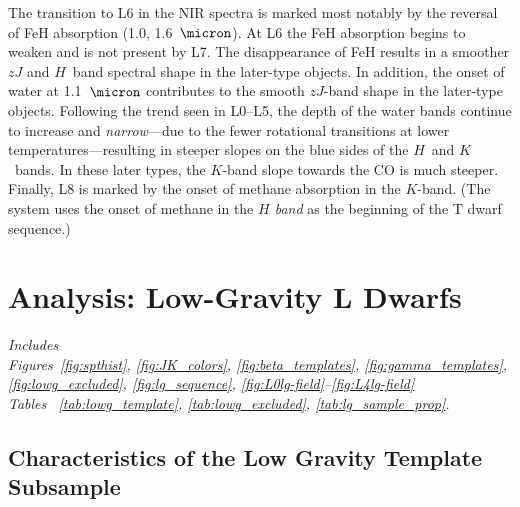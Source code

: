 \documentclass[12pt,preprint]{aastex}
\begin{document}
The transition to L6 in the NIR spectra is marked most notably by the reversal of FeH absorption (1.0, 1.6~$\micron$). 
At L6 the FeH absorption begins to weaken and is not present by L7. 
The disappearance of FeH results in a smoother $zJ$ and $H$~band spectral shape in the later-type objects. In addition, the onset of water at 1.1~$\micron$ contributes to the smooth $zJ$-band shape in the later-type objects. Following the trend seen in L0--L5, the depth of the water bands continue to increase and \emph{narrow}---due to the fewer rotational transitions at lower temperatures---resulting in steeper slopes on the blue sides of the $H$~and $K$~bands. 
In these later types, the $K$-band slope towards the CO is much steeper. 
Finally, L8 is marked by the onset of methane absorption in the $K$-band. 
(The \citet{Geballe02} system uses the onset of methane in the \emph{$H$ band} as the beginning of the T dwarf sequence.) 


\clearpage
\section{Analysis: Low-Gravity L Dwarfs}
\label{sec:lowg}

\emph{Includes \\
Figures~\ref{fig:spthist}, \ref{fig:JK_colors}, \ref{fig:beta_templates}, \ref{fig:gamma_templates}, \ref{fig:lowg_excluded}, \ref{fig:lg_sequence}, \ref{fig:L0lg-field}--\ref{fig:L4lg-field}\\
Tables ~\ref{tab:lowg_template}, \ref{tab:lowg_excluded}, \ref{tab:lg_sample_prop}.}

\subsection{Characteristics of the Low Gravity Template Subsample}
\label{sec:templates_lowg}
\end{document}
